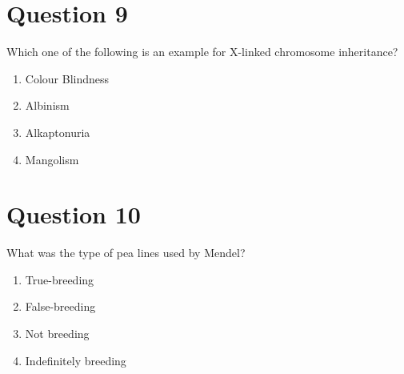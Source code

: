 \documentclass{article}
\begin{document}
\section*{Question 9}
Which one of the following is an example for X-linked chromosome inheritance?
\begin{enumerate}[label=(\alph*)]
\item Colour Blindness
\item Albinism
\item Alkaptonuria
\item Mangolism
\end{enumerate}
\newpage
\section*{Question 10}
What was the type of pea lines used by Mendel?
\begin{enumerate}[label=(\alph*)]
\item True-breeding
\item False-breeding
\item Not breeding
\item Indefinitely breeding
\end{enumerate}
\newpage
\end{document}
